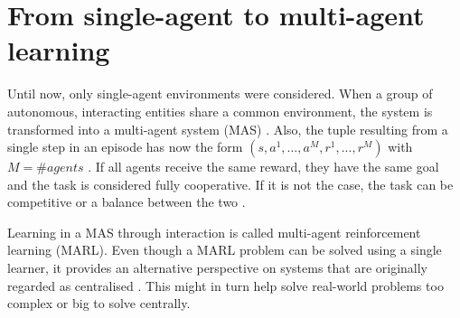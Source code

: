 
\section{From single-agent to multi-agent learning}

Until now, only single-agent environments were considered. When a group of autonomous, interacting entities share a common environment, the system is transformed into a multi-agent system (MAS) \cite{bloembergen_evolutionary_2015}. Also, the tuple resulting from a single step in an episode has now the form $(s, a^1, ..., a^M, r^1, ..., r^M)$ with $M = \#agents$ \cite{l._leottau_decentralized_2017}. If all agents receive the same reward, they have the same goal and the task is considered fully cooperative. If it is not the case, the task can be competitive or a balance between the two \cite{panait_cooperative_2005}. 

Learning in a MAS through interaction is called multi-agent reinforcement learning (MARL). Even though a MARL problem can be solved using a single learner, it provides an alternative perspective on systems that are originally regarded as centralised \cite{busoniu_multi-agent_2010}. This might in turn help solve real-world problems too complex or big to solve centrally. 




 
